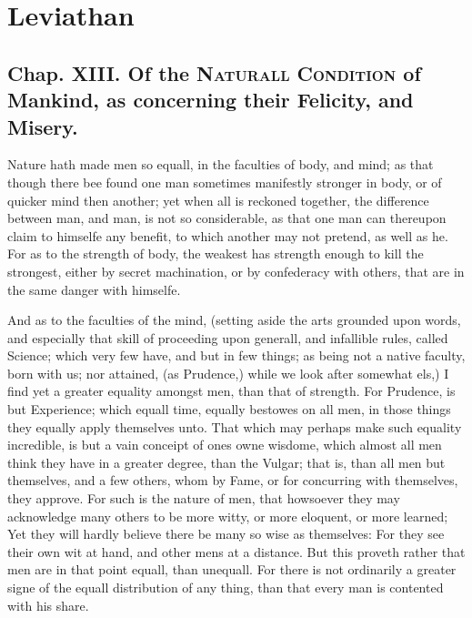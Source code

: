 
\author{Thomas Hobbes}
\chapter[Leviathan, chaps. 13 and 17]{Leviathan}

\section*{Chap. XIII. Of the \textsc{Naturall Condition} of
Mankind, as concerning their Felicity, and Misery.}

Nature hath made men so equall, in the faculties of body, and mind; as
that though there bee found one man sometimes manifestly stronger in
body, or of quicker mind then another; yet when all is reckoned
together, the difference between man, and man, is not so considerable,
as that one man can thereupon claim to himselfe any benefit, to which
another may not pretend, as well as he. For as to the strength of
body, the weakest has strength enough to kill the strongest, either by
secret machination, or by confederacy with others, that are in the
same danger with himselfe.

And as to the faculties of the mind, (setting aside the arts
grounded upon words, and especially that skill of proceeding upon
generall, and infallible rules, called Science; which very few have,
and but in few things; as being not a native faculty, born with us;
nor attained, (as Prudence,) while we look after somewhat els,) I find
yet a greater equality amongst men, than that of strength. For
Prudence, is but Experience; which equall time, equally bestowes on
all men, in those things they equally apply themselves unto. That
which may perhaps make such equality incredible, is but a vain
conceipt of ones owne wisdome, which almost all men think they have
in a greater degree, than the Vulgar; that is, than all men but
themselves, and a few others, whom by Fame, or for concurring with
themselves, they approve. For such is the nature of men, that
howsoever they may acknowledge many others to be more witty, or more
eloquent, or more learned; Yet they will hardly believe there be many
so wise as themselves: For they see their own wit at hand, and other
mens at a distance. But this proveth rather that men are in that
point equall, than unequall. For there is not ordinarily a greater
signe of the equall distribution of any thing, than that every man is
contented with his share.

